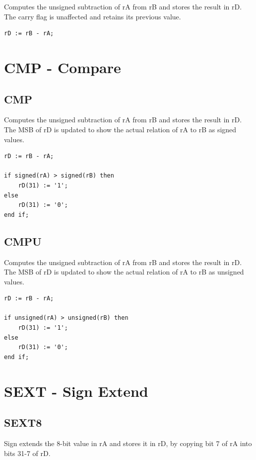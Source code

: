 \documentclass{UoYCSproject}
\begin{document}
Computes the unsigned subtraction of rA from rB and stores the result
in rD. The carry flag is unaffected and retains its previous value.

\begin{lstlisting}
rD := rB - rA;
\end{lstlisting}

\section{CMP - Compare}

\subsection{CMP}

Computes the unsigned subtraction of rA from rB and stores the result in rD. The MSB of rD
is updated to show the actual relation of rA to rB as signed values.

\begin{lstlisting}
rD := rB - rA;

if signed(rA) > signed(rB) then
    rD(31) := '1';
else
    rD(31) := '0';
end if;
\end{lstlisting}

\subsection{CMPU}

Computes the unsigned subtraction of rA from rB and stores the result in rD. The MSB of rD
is updated to show the actual relation of rA to rB as unsigned values.

\begin{lstlisting}
rD := rB - rA;

if unsigned(rA) > unsigned(rB) then
    rD(31) := '1';
else
    rD(31) := '0';
end if;
\end{lstlisting}

\section{SEXT - Sign Extend}

\subsection{SEXT8}

Sign extends the 8-bit value in rA and stores it in rD, by copying bit 7 of rA into bits 31-7 of rD.
\end{document}
